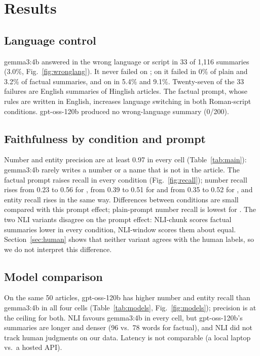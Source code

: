 \section{Results}
\label{sec:results}


\subsection{Language control}
gemma3:4b answered in the wrong language or script in 33 of 1,116 summaries (3.0\%, Fig.~\ref{fig:wronglang}). It never failed on ; on  it failed in 0\% of plain and 3.2\% of factual summaries, and on  in 5.4\% and 9.1\%. Twenty-seven of the 33 failures are English summaries of Hinglish articles. The factual prompt, whose rules are written in English, increases language switching in both Roman-script conditions. gpt-oss-120b produced no wrong-language summary (0/200).

\subsection{Faithfulness by condition and prompt}
Number and entity precision are at least 0.97 in every cell (Table~\ref{tab:main}): gemma3:4b rarely writes a number or a name that is not in the article. The factual prompt raises recall in every condition (Fig.~\ref{fig:recall}); number recall rises from 0.23 to 0.56 for , from 0.39 to 0.51 for  and from 0.35 to 0.52 for , and entity recall rises in the same way. Differences between conditions are small compared with this prompt effect; plain-prompt number recall is lowest for . The two NLI variants disagree on the prompt effect: NLI-chunk scores factual summaries lower in every condition, NLI-window scores them about equal. Section~\ref{sec:human} shows that neither variant agrees with the human labels, so we do not interpret this difference.

\subsection{Model comparison}
On the same 50 articles, gpt-oss-120b has higher number and entity recall than gemma3:4b in all four cells (Table~\ref{tab:models}, Fig.~\ref{fig:models}); precision is at the ceiling for both. NLI favours gemma3:4b in every cell, but gpt-oss-120b's summaries are longer and denser (96 vs.\ 78 words for  factual), and NLI did not track human judgments on our data. Latency is not comparable (a local laptop vs.\ a hosted API).

